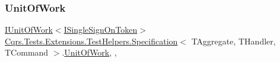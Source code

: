 \subsubsection{\texorpdfstring{Unit\+Of\+Work}{UnitOfWork}}
{\footnotesize\ttfamily \hyperlink{interfaceCqrs_1_1Domain_1_1IUnitOfWork}{I\+Unit\+Of\+Work}$<$\hyperlink{interfaceCqrs_1_1Authentication_1_1ISingleSignOnToken}{I\+Single\+Sign\+On\+Token}$>$ \hyperlink{classCqrs_1_1Tests_1_1Extensions_1_1TestHelpers_1_1Specification}{Cqrs.\+Tests.\+Extensions.\+Test\+Helpers.\+Specification}$<$ T\+Aggregate, T\+Handler, T\+Command $>$.\hyperlink{classCqrs_1_1Domain_1_1UnitOfWork}{Unit\+Of\+Work}\hspace{0.3cm}{\ttfamily [get]}, {\ttfamily [set]}, {\ttfamily [protected]}}

